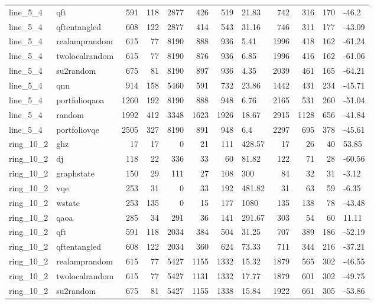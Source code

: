 \begin{longtable}{llrrrrrlrrrl}
line\_5\_4 & qft & 591 & 118 & 2877 & 426 & 519 & 21.83 & 742 & 316 & 170 & -46.2 \\
line\_5\_4 & qftentangled & 608 & 122 & 2877 & 414 & 543 & 31.16 & 746 & 311 & 177 & -43.09 \\
line\_5\_4 & realamprandom & 615 & 77 & 8190 & 888 & 936 & 5.41 & 1996 & 418 & 162 & -61.24 \\
line\_5\_4 & twolocalrandom & 615 & 77 & 8190 & 876 & 936 & 6.85 & 1996 & 416 & 162 & -61.06 \\
line\_5\_4 & su2random & 675 & 81 & 8190 & 897 & 936 & 4.35 & 2039 & 461 & 165 & -64.21 \\
line\_5\_4 & qnn & 914 & 158 & 5460 & 591 & 732 & 23.86 & 1442 & 431 & 234 & -45.71 \\
line\_5\_4 & portfolioqaoa & 1260 & 192 & 8190 & 888 & 948 & 6.76 & 2165 & 531 & 260 & -51.04 \\
line\_5\_4 & random & 1992 & 412 & 3348 & 1623 & 1926 & 18.67 & 2915 & 1128 & 656 & -41.84 \\
line\_5\_4 & portfoliovqe & 2505 & 327 & 8190 & 891 & 948 & 6.4 & 2297 & 695 & 378 & -45.61 \\
ring\_10\_2 & ghz & 17 & 17 & 0 & 21 & 111 & 428.57 & 17 & 26 & 40 & 53.85 \\
ring\_10\_2 & dj & 118 & 22 & 336 & 33 & 60 & 81.82 & 122 & 71 & 28 & -60.56 \\
ring\_10\_2 & graphstate & 150 & 29 & 111 & 27 & 108 & 300 & 84 & 32 & 31 & -3.12 \\
ring\_10\_2 & vqe & 253 & 31 & 0 & 33 & 192 & 481.82 & 31 & 63 & 59 & -6.35 \\
ring\_10\_2 & wstate & 253 & 135 & 0 & 15 & 177 & 1080 & 135 & 138 & 78 & -43.48 \\
ring\_10\_2 & qaoa & 285 & 34 & 291 & 36 & 141 & 291.67 & 303 & 54 & 60 & 11.11 \\
ring\_10\_2 & qft & 591 & 118 & 2034 & 384 & 504 & 31.25 & 707 & 389 & 186 & -52.19 \\
ring\_10\_2 & qftentangled & 608 & 122 & 2034 & 360 & 624 & 73.33 & 711 & 344 & 216 & -37.21 \\
ring\_10\_2 & realamprandom & 615 & 77 & 5427 & 1155 & 1332 & 15.32 & 1879 & 565 & 302 & -46.55 \\
ring\_10\_2 & twolocalrandom & 615 & 77 & 5427 & 1131 & 1332 & 17.77 & 1879 & 601 & 302 & -49.75 \\
ring\_10\_2 & su2random & 675 & 81 & 5427 & 1155 & 1338 & 15.84 & 1922 & 661 & 305 & -53.86 \\

\end{longtable}

